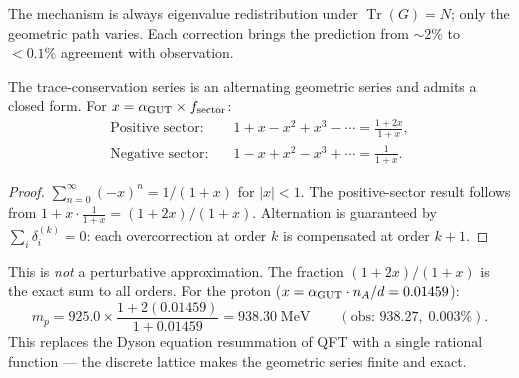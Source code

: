 The mechanism is always eigenvalue redistribution under $\operatorname{Tr}(G) = N$; only the geometric path varies.  Each correction brings the prediction from $\sim\!2\%$ to $<\!0.1\%$ agreement with observation.

\begin{theorem}
\label{thm:resummation}
The trace-conservation series is an alternating geometric series and admits a closed form.  For $x = \alpha_{\mathrm{GUT}} \times f_\mathrm{sector}$:
\begin{align}
\text{Positive sector:}&\quad 1 + x - x^2 + x^3 - \cdots = \frac{1 + 2x}{1 + x}, \\
\text{Negative sector:}&\quad 1 - x + x^2 - x^3 + \cdots = \frac{1}{1 + x}.
\end{align}
\end{theorem}

\begin{proof}
$\sum_{n=0}^{\infty}(-x)^n = 1/(1+x)$ for $|x| < 1$.  The positive-sector result follows from $1 + x \cdot \tfrac{1}{1+x} = (1+2x)/(1+x)$.  Alternation is guaranteed by $\sum_i \delta^{(k)}_i = 0$: each overcorrection at order $k$ is compensated at order $k+1$.
\end{proof}

\begin{remark}
This is \emph{not} a perturbative approximation.  The fraction $(1+2x)/(1+x)$ is the exact sum to all orders.  For the proton ($x = \alpha_{\mathrm{GUT}} \cdot n_A/d = 0.01459$):
\begin{equation}
m_p = 925.0 \times \frac{1 + 2(0.01459)}{1 + 0.01459} = 938.30\;\text{MeV}
\qquad (\text{obs: } 938.27,\; 0.003\%).
\end{equation}
This replaces the Dyson equation resummation of QFT with a single rational function --- the discrete lattice makes the geometric series finite and exact.
\end{remark}
